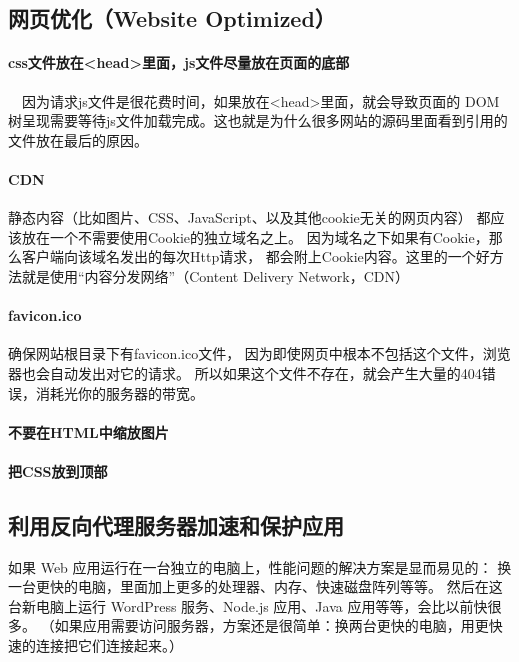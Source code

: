 \documentclass{book}
\begin{document}
\subsection{网页优化（Website Optimized）}

\paragraph{css文件放在<head>里面，js文件尽量放在页面的底部}~~因为请求js文件是很花费时间，如果放在<head>里面，就会导致页面的 DOM树呈现需要等待js文件加载完成。这也就是为什么很多网站的源码里面看到引用的文件放在最后的原因。

\paragraph{CDN}静态内容（比如图片、CSS、JavaScript、以及其他cookie无关的网页内容）
都应该放在一个不需要使用Cookie的独立域名之上。
因为域名之下如果有Cookie，那么客户端向该域名发出的每次Http请求，
都会附上Cookie内容。这里的一个好方法就是使用“内容分发网络”（Content Delivery Network，CDN）

\paragraph{favicon.ico}确保网站根目录下有favicon.ico文件，
因为即使网页中根本不包括这个文件，浏览器也会自动发出对它的请求。
所以如果这个文件不存在，就会产生大量的404错误，消耗光你的服务器的带宽。

\paragraph{不要在HTML中缩放图片}

\paragraph{把CSS放到顶部}

\subsection{利用反向代理服务器加速和保护应用}

如果 Web 应用运行在一台独立的电脑上，性能问题的解决方案是显而易见的：
换一台更快的电脑，里面加上更多的处理器、内存、快速磁盘阵列等等。
然后在这台新电脑上运行 WordPress 服务、Node.js 应用、Java 应用等等，会比以前快很多。
（如果应用需要访问服务器，方案还是很简单：换两台更快的电脑，用更快速的连接把它们连接起来。）
\end{document}
